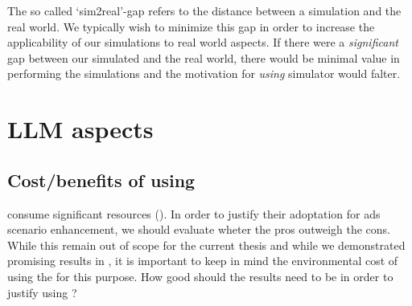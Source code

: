The so called `sim2real'-gap refers to the distance between a simulation and the real world. We
typically wish to minimize this gap in order to increase the applicability of our simulations to
real world aspects. If there were a \emph{significant} gap between our simulated 
and the real world, there would be minimal value in performing the simulations and the motivation
for \emph{using} simulator would falter.







\section{LLM aspects}

\subsection{Cost/benefits of using }

 consume significant resources (). In order to justify their
adoptation for \acrshort{ads} scenario enhancement, we should evaluate wheter the pros outweigh the
cons. While this remain out of scope for the current thesis and while we demonstrated promising
results in , it is important to keep in mind the environmental cost of using the
 for this purpose. How good should the results need to be in order to justify using
?

